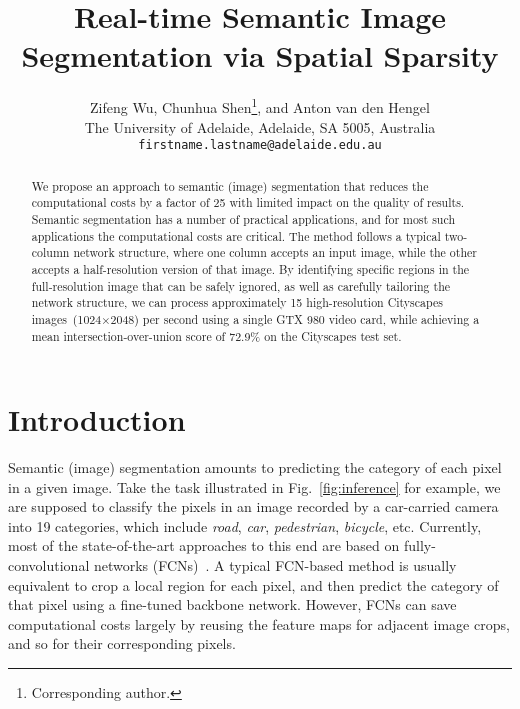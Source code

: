 \documentclass[10pt,twocolumn,letterpaper]{article}
\begin{document}
%
\title{Real-time Semantic Image Segmentation via Spatial Sparsity}




\author{Zifeng Wu, Chunhua Shen\thanks{Corresponding author.}, and Anton van den Hengel\\
The University of Adelaide,
Adelaide, SA 5005, Australia\\
{\tt\small firstname.lastname@adelaide.edu.au}
%
%
%
%
%
%
%
%
%
%
}



\maketitle
%

%
\begin{abstract}
%
%
%
%
%
%
%
%
%
We propose an approach to semantic (image) segmentation that reduces the computational costs by a factor of 25 with limited impact on the quality of results.
Semantic segmentation has a number of practical applications,
and for most such applications the computational costs are critical.
The method follows a typical two-column network structure,
where one column accepts an input image,
while the other accepts a half-resolution version of that image.
By identifying specific regions in the full-resolution image that can be safely ignored,
as well as carefully tailoring the network structure,
we can process approximately 15 high-resolution Cityscapes images~(1024$\times$2048) per second using a single GTX 980 video card,
while achieving a mean intersection-over-union score of 72.9\% on the Cityscapes test set.
\end{abstract}

%
\section{Introduction}
Semantic (image) segmentation amounts to predicting the category of each pixel in a given image.
Take the task illustrated in Fig.~\ref{fig:inference} for example,
we are supposed to classify the pixels in an image recorded by a car-carried camera into 19 categories,
which include \textit{road}, \textit{car}, \textit{pedestrian}, \textit{bicycle}, etc.
Currently, most of the state-of-the-art approaches to this end are based on fully-convolutional networks (FCNs)~\cite{FCN.CVPR.2015.Long}.
A typical FCN-based method is usually equivalent to crop a local region for each pixel,
and then predict the category of that pixel using a fine-tuned backbone network.
However, FCNs can save computational costs largely by reusing the feature maps for adjacent image crops,
and so for their corresponding pixels.
\end{document}
